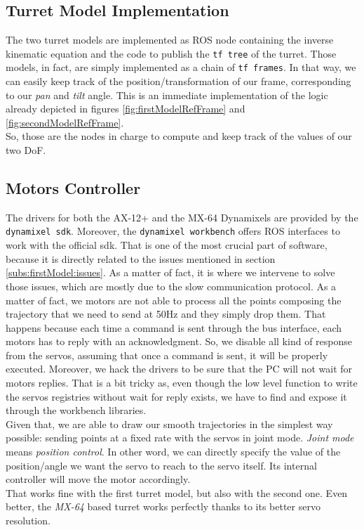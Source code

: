 \subsection{Turret Model Implementation}
The two turret models are implemented as ROS node containing the inverse kinematic equation and the code to publish the \texttt{tf tree} of the turret. Those models, in fact, are simply implemented as a chain of \texttt{tf frames}. In that way, we can easily keep track of the position/transformation of our frame, corresponding to our \emph{pan} and \emph{tilt} angle. This is an immediate implementation of the logic already depicted in figures \ref{fig:firstModelRefFrame} and \ref{fig:secondModelRefFrame}.\\
So, those are the nodes in charge to compute and keep track of the values of our two DoF.


\subsection{Motors Controller}
The drivers for both the AX-12+ and the MX-64 Dynamixels are provided by the \texttt{dynamixel sdk}. Moreover, the \texttt{dynamixel workbench} offers ROS interfaces to work with the official sdk. That is one of the most crucial part of software, because it is directly related to the issues mentioned in section \ref{subs:firstModel:issues}. As a matter of fact, it is where we intervene to solve those issues, which are mostly due to the slow communication protocol. As a matter of fact, we motors are not able to process all the points composing the trajectory that we need to send at 50Hz and they simply drop them. That happens because each time a command is sent through the bus interface, each motors has to reply with an acknowledgment. So, we disable all kind of response from the servos, assuming that once a command is sent, it will be properly executed. Moreover, we hack the drivers to be sure that the PC will not wait for motors replies. That is a bit tricky as, even though the low level function to write the servos registries without wait for reply exists, we have to find and expose it through the workbench libraries.\\
Given that, we are able to draw our smooth trajectories in the simplest way possible: sending points at a fixed rate with the servos in joint mode. \emph{Joint mode} means \emph{position control}. In other word, we can directly specify the value of the position/angle we want the servo to reach to the servo itself. Its internal controller will move the motor accordingly.\\
That works fine with the first turret model, but also with the second one. Even better, the \emph{MX-64} based turret works perfectly thanks to its better servo resolution.\\

